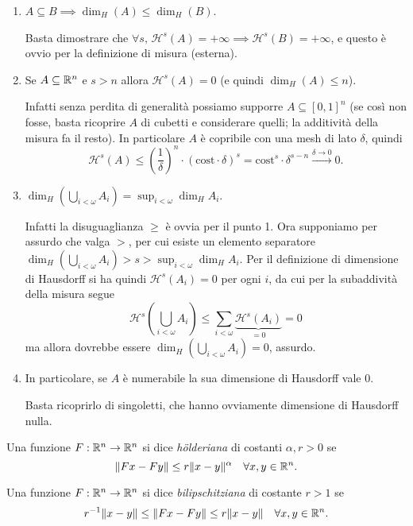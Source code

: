 \begin{enumerate}
	\item $A\subseteq B\implies \dim_{H}(A)\leq \dim_{H}(B)$.
	
	Basta dimostrare che $\forall s,\, \mathcal H^{s}(A) = +\infty \implies \mathcal H^{s}(B) = +\infty$, e questo è ovvio per la definizione di misura (esterna).
	
	\item Se $A\subseteq\mathbb{R}^{n}$ e $s>n$ allora $\mathcal H^{s}(A) = 0$ (e quindi $\dim_{H}(A)\leq n$).
	
	Infatti senza perdita di generalità possiamo supporre $A\subseteq[0,1]^{n}$ (se così non fosse, basta ricoprire $A$ di cubetti e considerare quelli; la additività della misura fa il resto).
	In particolare $A$ è copribile con una mesh di lato $\delta$, quindi 
	$$\mathcal H^{s}(A)\leq \left(\frac{1}{\delta}\right)^{n}\cdot(\text{cost}\cdot\delta)^{s} = \text{cost}^{s}\cdot\delta^{s-n}\xrightarrow{\delta\to0}0.$$
	
	\item $\dim_{H}\left(\bigcup_{i<\omega}A_{i}\right) = \sup_{i<\omega}\dim_{H}A_{i}$.
	
	Infatti la disuguaglianza $\geq$ è ovvia per il punto 1. 
	Ora supponiamo per assurdo che valga $>$, per cui esiste un elemento separatore $\dim_{H}\left(\bigcup_{i<\omega}A_{i}\right) > s > \sup_{i<\omega}\dim_{H}A_{i}$. 
	Per il definizione di dimensione di Hausdorff si ha quindi $\mathcal H^{s}(A_{i}) = 0$ per ogni $i$, da cui per la subaddività della misura segue
	$$\mathcal H^{s}\left(\bigcup_{i<\omega}A_{i}\right) \leq \sum_{i<\omega}\underbrace{\mathcal H^{s}(A_{i})}_{=0} = 0$$
	ma allora dovrebbe essere $\dim_{H}\left(\bigcup_{i<\omega}A_{i}\right) = 0$, assurdo.
	
	\item In particolare, se $A$ è numerabile la sua dimensione di Hausdorff vale 0.
	
	Basta ricoprirlo di singoletti, che hanno ovviamente dimensione di Hausdorff nulla. 
\end{enumerate}

\begin{definizione}
	Una funzione $F: \mathbb{R}^{n}\to \mathbb{R}^{n}$ si dice \emph{hölderiana} di costanti $\alpha,r>0$ se 
	$$\|Fx-Fy\|\leq r\|x-y\|^{\alpha}\quad\forall x,y\in \mathbb{R}^{n}.$$
\end{definizione}

\begin{definizione}
	Una funzione $F: \mathbb{R}^{n}\to \mathbb{R}^{n}$ si dice \emph{bilipschitziana} di costante $r>1$ se 
	$$r^{-1}\|x-y\|\leq\|Fx-Fy\|\leq r\|x-y\|\quad \forall x,y\in\mathbb{R}^{n}.$$
\end{definizione}

